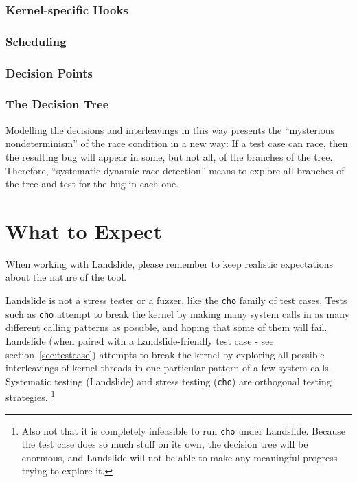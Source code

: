 \documentclass{article}
\begin{document}
\subsubsection{Kernel-specific Hooks}


\subsubsection{Scheduling}
\subsubsection{Decision Points}
\subsubsection{The Decision Tree}

Modelling the decisions and interleavings in this way presents the ``mysterious nondeterminism'' of the race condition in a new way: If a test case can race, then the resulting bug will appear in some, but not all, of the branches of the tree.
Therefore, ``systematic dynamic race detection'' means to explore all branches of the tree and test for the bug in each one.

\section{What to Expect}

When working with Landslide, please remember to keep realistic expectations about the nature of the tool.

Landslide is not a stress tester or a fuzzer, like the \texttt{cho} family of test cases.
Tests such as \texttt{cho} attempt to break the kernel by making many system calls in as many different calling patterns as possible, and hoping that some of them will fail.
Landslide (when paired with a Landslide-friendly test case - see section~\ref{sec:testcase}) attempts to break the kernel by exploring all possible interleavings of kernel threads in one particular pattern of a few system calls.
Systematic testing (Landslide) and stress testing (\texttt{cho}) are orthogonal testing strategies.
\footnote{Also not that it is completely infeasible to run \texttt{cho} under Landslide. Because the test case does so much stuff on its own, the decision tree will be enormous, and Landslide will not be able to make any meaningful progress trying to explore it.}
\end{document}
